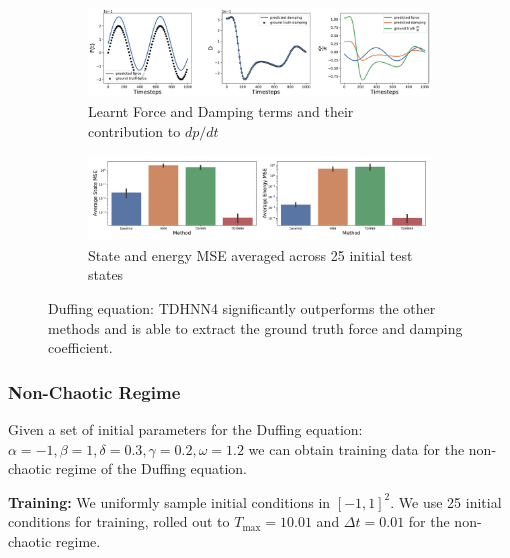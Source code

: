 \documentclass[twoside]{article}
\begin{document}
\begin{figure}[h!]
\centering
\captionsetup{justification=centering}
	\begin{subfigure}[b]{0.48\textwidth}
		\centering
		\includegraphics[width=\textwidth]{figures/figures/duffing/1/duffing_dpdt_0.pdf}
		\caption{Learnt Force and Damping terms and their contribution to $dp/dt$}
	\end{subfigure}
	\begin{subfigure}[b]{0.48\textwidth}
	    \centering
		\includegraphics[width=\textwidth]{figures/figures/duffing/1/duffing_errors_0.pdf}
		\caption{State and energy MSE averaged across 25 initial test states}
	\end{subfigure}
\caption{Duffing equation: TDHNN4 significantly outperforms the other methods and is able to extract the ground truth force and damping coefficient.}
\label{fig.duffing}
\end{figure}

\subsubsection{Non-Chaotic Regime}

Given a set of initial parameters for the Duffing equation: $\alpha =-1,\beta=1,\delta=0.3,\gamma=0.2,\omega=1.2$ we can obtain training data for the non-chaotic regime of the Duffing equation. 

\textbf{Training:} We uniformly sample initial conditions in $[-1,1]^2$. We use 25 initial conditions for training, rolled out to $T_{\max}=10.01$ and $\Delta t =0.01$ for the non-chaotic regime. 
\end{document}
